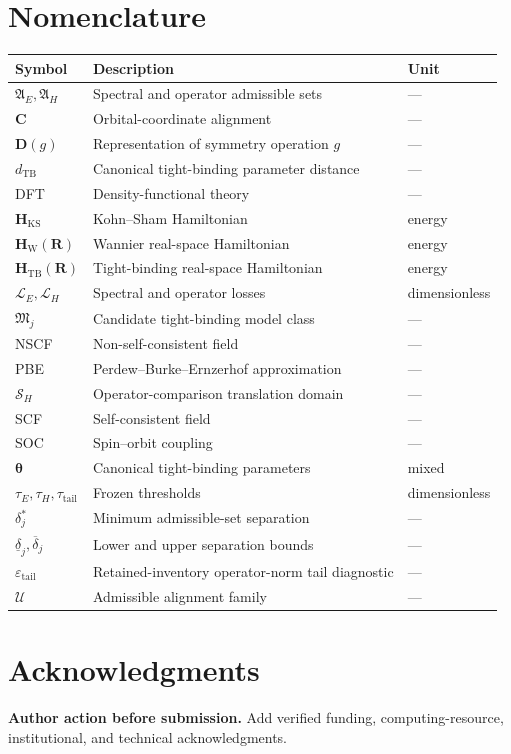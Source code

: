 \documentclass[11pt]{article}
\newenvironment{prospective}{\color{prospectivered}}{}
\begin{document}
\section{Nomenclature}
\begin{center}\small
\begin{tabularx}{\textwidth}{XXX}
\toprule
\textbf{Symbol} & \textbf{Description} & \textbf{Unit} \\
\midrule
$\mathfrak A_E,\mathfrak A_H$ & Spectral and operator admissible sets & — \\
$\mathbf C$ & Orbital-coordinate alignment & — \\
$\mathbf D(g)$ & Representation of symmetry operation $g$ & — \\
$d_{\mathrm{TB}}$ & Canonical tight-binding parameter distance & — \\
DFT & Density-functional theory & — \\
$\mathbf H_{\mathrm{KS}}$ & Kohn–Sham Hamiltonian & energy \\
$\mathbf H_{\mathrm W}(\mathbf R)$ & Wannier real-space Hamiltonian & energy \\
$\mathbf H_{\mathrm{TB}}(\mathbf R)$ & Tight-binding real-space Hamiltonian & energy \\
$\mathcal L_E,\mathcal L_H$ & Spectral and operator losses & dimensionless \\
$\mathfrak M_j$ & Candidate tight-binding model class & — \\
NSCF & Non-self-consistent field & — \\
PBE & Perdew–Burke–Ernzerhof approximation & — \\
$\mathcal S_H$ & Operator-comparison translation domain & — \\
SCF & Self-consistent field & — \\
SOC & Spin–orbit coupling & — \\
$\boldsymbol\theta$ & Canonical tight-binding parameters & mixed \\
$\tau_E,\tau_H,\tau_{\mathrm{tail}}$ & Frozen thresholds & dimensionless \\
$\delta_j^\ast$ & Minimum admissible-set separation & — \\
$\underline\delta_j,\overline\delta_j$ & Lower and upper separation bounds & — \\
$\varepsilon_{\mathrm{tail}}$ & Retained-inventory operator-norm tail diagnostic & — \\
$\mathcal U$ & Admissible alignment family & — \\
\bottomrule
\end{tabularx}
\end{center}
\begin{prospective}
\section{Acknowledgments}
\textbf{Author action before submission.} Add verified funding, computing-resource, institutional, and technical acknowledgments.

\end{prospective}
\printbibliography[title={References}]
\end{document}
